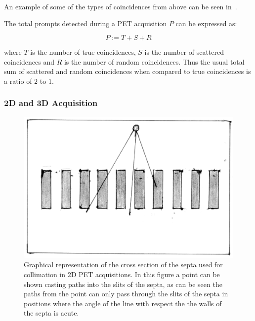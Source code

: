             An example of some of the types of coincidences from above can be seen in~.
            
            The total prompts detected during a \gls{PET} acquisition $P$ can be expressed as:
            
            \begin{equation}
                P := T + S + R
            \end{equation}
            
            \noindent where $T$ is the number of true coincidences, $S$ is the number of scattered coincidences and $R$ is the number of random coincidences. Thus the usual total sum of scattered and random coincidences when compared to true coincidences is a ratio of $2$ to $1$.
            
            \subsubsection{2D and 3D Acquisition} \label{sec:2d_and_3d_acquisition}
                \begin{figure}
                    \centering
                    
                    \includegraphics[width=1.0\linewidth]{figures/background_septa.png}
                    
                    \captionsetup{singlelinecheck=false, justification=raggedright}
                    \caption{Graphical representation of the cross section of the septa used for collimation in \gls{2D} \gls{PET} acquisitions. In this figure a point can be shown casting paths into the slits of the septa, as can be seen the paths from the point can only pass through the slits of the septa in positions where the angle of the line with respect the the walls of the septa is acute.} \label{fig:2d_and_3d_acquisition_septa}
                \end{figure}
                
